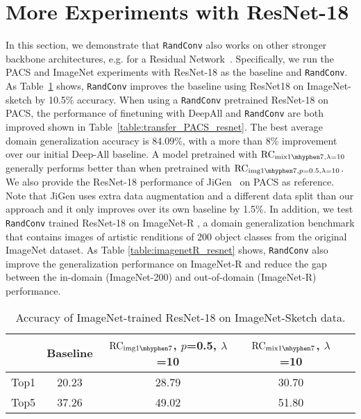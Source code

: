 \documentclass{article} \usepackage{iclr2021_conference,times}
\newcommand{\RandConv}{\texttt{RandConv}}
\begin{document}
\section{More Experiments with ResNet-18}
\label{resnet_exp}
In this section, we demonstrate that {\RandConv} also works on other stronger backbone architectures, e.g. for a Residual Network~\citet{he2016deep}. Specifically, we run the PACS and ImageNet experiments with ResNet-18 as the baseline and {\RandConv}. As Table~\ref{table:imagenet_resnet} shows,  {\RandConv} improves the baseline using ResNet18 on ImageNet-sketch by 10.5\% accuracy. When using a {\RandConv} pretrained ResNet-18 on PACS, the performance of finetuning with DeepAll and {\RandConv} are both improved shown in Table~\ref{table:transfer_PACS_resnet}. The best average domain generalization accuracy is 84.09\%, with a more than 8\% improvement over our initial Deep-All baseline. A model pretrained with $\text{RC}_{\text{mix}{1\mhyphen7, \lambda=10}}$ generally performs better than when pretrained with $\text{RC}_{\text{img}1\mhyphen7,p=0.5,\lambda=10}$. We also provide the ResNet-18 performance of JiGen~\citep{carlucci2019jigen} on PACS as reference. Note that JiGen uses extra data augmentation and a different data split than our approach and it only improves over its own baseline by 1.5\%. In addition, we test {\RandConv} trained ResNet-18 on ImageNet-R \citep{hendrycks2020many}, a domain generalization benchmark that contains images of artistic renditions of 200 object classes from the original ImageNet dataset. As Table \ref{table:imagenetR_resnet} shows, {\RandConv} also improve the generalization performance on ImageNet-R and reduce the gap between the in-domain (ImageNet-200) and out-of-domain (ImageNet-R) performance. 

\begin{table}[htp]
	\small
\caption{Accuracy of ImageNet-trained ResNet-18 on ImageNet-Sketch data.}
	\label{table:imagenet_resnet}
	\centering
	\begin{tabular}{c|cccc}
		\toprule
		      & Baseline &
		$\text{RC}_{\text{img}{1\mhyphen7}}$\tiny, $p$=0.5, $\lambda$=10   & $\text{RC}_{\text{mix}{1\mhyphen7}}$\tiny, $\lambda$=10   \\
		\toprule
		    Top1  & 20.23        & 
		28.79 &  30.70 \\
		 Top5 & 37.26 
		& 49.02 & 51.80 \\
		\bottomrule
	\end{tabular}
\end{table}
\end{document}
